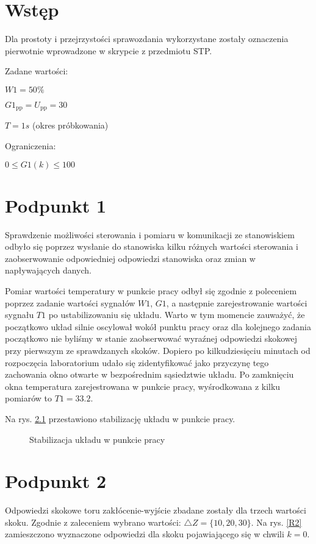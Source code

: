\chapter{Wstęp}
Dla prostoty i przejrzystości sprawozdania wykorzystane zostały oznaczenia pierwotnie wprowadzone w skrypcie z przedmiotu STP.

\bigskip

Zadane wartości:

\smallskip

$W1=50\%$

\smallskip

$G1_{\mathrm{pp}}=U_{\mathrm{pp}}=30$

\smallskip

$T=1s$ (okres próbkowania)

\bigskip

Ograniczenia:

\smallskip

$0 \le G1(k) \le 100$

\chapter{Podpunkt 1}
Sprawdzenie możliwości sterowania i pomiaru w komunikacji ze stanowiskiem odbyło się poprzez wysłanie do stanowiska kilku różnych wartości sterowania i zaobserwowanie odpowiedniej odpowiedzi stanowiska oraz zmian w napływających danych.

Pomiar wartości temperatury w punkcie pracy odbył się zgodnie z poleceniem poprzez zadanie wartości sygnałów $W1$, $G1$, a następnie zarejestrowanie wartości sygnału $T1$ po ustabilizowaniu się układu. Warto w tym momencie zauważyć, że początkowo układ silnie oscylował wokół punktu pracy oraz dla kolejnego zadania początkowo nie byliśmy w stanie zaobserwować wyraźnej odpowiedzi skokowej przy pierwszym ze sprawdzanych skoków. Dopiero po kilkudziesięciu minutach od rozpoczęcia laboratorium udało się zidentyfikować jako przyczynę tego zachowania okno otwarte w bezpośrednim sąsiedztwie układu. Po zamknięciu okna temperatura zarejestrowana w punkcie pracy, wyśrodkowana z kilku pomiarów to $T1=\num{33,2}$.

Na rys. \ref{R1} przestawiono stabilizację układu w punkcie pracy.

\begin{figure}[ht]
\centering

\caption{Stabilizacja układu w punkcie pracy}
\label{R1}
\end{figure}

\chapter{Podpunkt 2}
Odpowiedzi skokowe toru zakłócenie-wyjście zbadane zostały dla trzech wartości skoku. Zgodnie z zaleceniem wybrano wartości: $\triangle Z = \{10, 20, 30\}$. Na rys. \ref{R2} zamieszczono wyznaczone odpowiedzi dla skoku pojawiającego się w chwili $k=\num{0}$.

